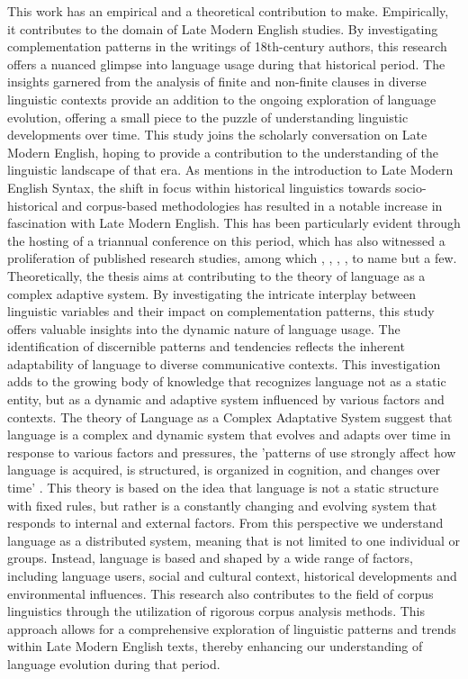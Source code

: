 \documentclass[final]{clv3} %
\begin{document}
This work has an empirical and a theoretical contribution to make. Empirically, it contributes to the domain of Late Modern English studies. By investigating complementation patterns in the writings of 18th-century authors, this research offers a nuanced glimpse into language usage during that historical period. The insights garnered from the analysis of finite and non-finite clauses in diverse linguistic contexts provide an addition to the ongoing exploration of language evolution, offering a small piece to the puzzle of understanding linguistic developments over time. This study joins the scholarly conversation on Late Modern English, hoping to provide a contribution to the understanding of the linguistic landscape of that era.
As \citet{hundt2014introduction} mentions in the introduction to Late Modern English Syntax, the shift in focus within historical linguistics towards socio-historical and corpus-based methodologies has resulted in a notable increase in fascination with Late Modern English. This has been particularly evident through the hosting of a triannual conference on this period, which has also witnessed a proliferation of published research studies, among which \citet{cuyckens2014variability}, \citet{rohdenburg2014changing}, \citet{fonteyn2020individuality}, \citet{cuyckens2021complexity}, to name but a few.
Theoretically, the thesis aims at contributing to the theory of language as a complex adaptive system. By investigating the intricate interplay between linguistic variables and their impact on complementation patterns, this study offers valuable insights into the dynamic nature of language usage. The identification of discernible patterns and tendencies reflects the inherent adaptability of language to diverse communicative contexts. This investigation adds to the growing body of knowledge that recognizes language not as a static entity, but as a dynamic and adaptive system influenced by various factors and contexts.
The theory of Language as a Complex Adaptative System suggest that language is a complex and dynamic system that evolves and adapts over time in response to various factors and pressures, the 'patterns of use strongly affect how language is acquired, is structured, is organized in cognition, and changes over time' 
\citep*[p.~2]{five2009language}. This theory is based on the idea that language is not a static structure with fixed rules, but rather is a constantly changing and evolving system that responds to internal and external factors. From this perspective we understand language as a distributed system, meaning that is not limited to one individual or groups. Instead, language is based and shaped by a wide range of factors, including language users, social and cultural context, historical developments and environmental influences.
This research also contributes to the field of corpus linguistics through the utilization of rigorous corpus analysis methods. This approach allows for a comprehensive exploration of linguistic patterns and trends within Late Modern English texts, thereby enhancing our understanding of language evolution during that period.
 
\end{document}

